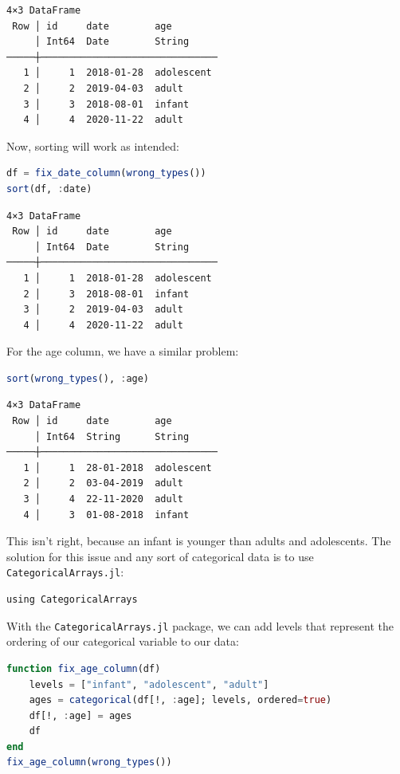 \documentclass[
  notoc %
]{tufte-book}
\newcommand{\passthrough}[1]{#1}
\begin{document}
\begin{lstlisting}[language=Output]
4×3 DataFrame
 Row │ id     date        age
     │ Int64  Date        String
─────┼───────────────────────────────
   1 │     1  2018-01-28  adolescent
   2 │     2  2019-04-03  adult
   3 │     3  2018-08-01  infant
   4 │     4  2020-11-22  adult
\end{lstlisting}

Now, sorting will work as intended:

\begin{lstlisting}[language=Julia]
df = fix_date_column(wrong_types())
sort(df, :date)
\end{lstlisting}

\begin{lstlisting}[language=Output]
4×3 DataFrame
 Row │ id     date        age
     │ Int64  Date        String
─────┼───────────────────────────────
   1 │     1  2018-01-28  adolescent
   2 │     3  2018-08-01  infant
   3 │     2  2019-04-03  adult
   4 │     4  2020-11-22  adult
\end{lstlisting}

For the age column, we have a similar problem:

\begin{lstlisting}[language=Julia]
sort(wrong_types(), :age)
\end{lstlisting}

\begin{lstlisting}[language=Output]
4×3 DataFrame
 Row │ id     date        age
     │ Int64  String      String
─────┼───────────────────────────────
   1 │     1  28-01-2018  adolescent
   2 │     2  03-04-2019  adult
   3 │     4  22-11-2020  adult
   4 │     3  01-08-2018  infant
\end{lstlisting}

This isn't right, because an infant is younger than adults and
adolescents. The solution for this issue and any sort of categorical
data is to use \passthrough{\lstinline!CategoricalArrays.jl!}:

\begin{lstlisting}
using CategoricalArrays
\end{lstlisting}

With the \passthrough{\lstinline!CategoricalArrays.jl!} package, we can
add levels that represent the ordering of our categorical variable to
our data:

\begin{lstlisting}[language=Julia]
function fix_age_column(df)
    levels = ["infant", "adolescent", "adult"]
    ages = categorical(df[!, :age]; levels, ordered=true)
    df[!, :age] = ages
    df
end
fix_age_column(wrong_types())
\end{lstlisting}
\end{document}
